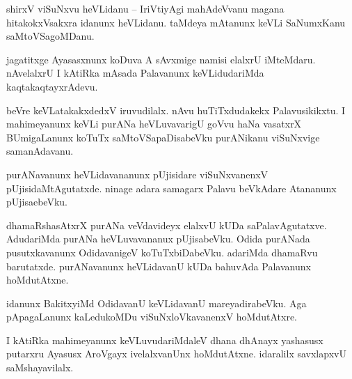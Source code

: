 \documentclass{article}
\begin{document}
\begin{mn}%
shirxV viSuNxvu heVLidanu -- IriVtiyAgi mahAdeVvanu magana hitakokxVsakxra idanunx heVLidanu. 
taMdeya mAtanunx keVLi SaNumxKanu saMtoVSagoMDanu.
\end{mn}

\begin{mn}%
jagatitxge Ayasasxnunx koDuva A sAvxmige namisi elalxrU iMteMdaru. nAvelalxrU I kAtiRka mAsada 
Palavanunx keVLidudariMda kaqtakaqtayxrAdevu.
\end{mn}

\begin{mn}%
beVre keVLatakakxdedxV iruvudilalx. nAvu huTiTxdudakekx Palavusikikxtu. I mahimeyanunx keVLi 
purANa heVLuvavarigU goVvu haNa vasatxrX BUmigaLanunx koTuTx saMtoVSapaDisabeVku purANikanu 
viSuNxvige samanAdavanu.
\end{mn}

\begin{mn}%
purANavanunx heVLidavananunx pUjisidare viSuNxvanenxV pUjisidaMtAgutatxde. ninage adara samagarx 
Palavu beVkAdare Atananunx pUjisaebeVku.
\end{mn}

\begin{mn}%
dhamaRshasAtxrX purANa veVdavideyx elalxvU kUDa saPalavAgutatxve. AdudariMda purANa heVLuvavananux 
pUjisabeVku. Odida purANada pusutxkavanunx OdidavanigeV koTuTxbiDabeVku. adariMda dhamaRvu 
barutatxde. purANavanunx heVLidavanU kUDa bahuvAda Palavanunx hoMdutAtxne.
\end{mn}

\begin{mn}%
idanunx BakitxyiMd OdidavanU keVLidavanU mareyadirabeVku. Aga pApagaLanunx kaLedukoMDu 
viSuNxloVkavanenxV hoMdutAtxre. 
\end{mn}

\begin{mn}%
I kAtiRka mahimeyanunx keVLuvudariMdaleV dhana dhAnayx yashasusx putarxru Ayasusx AroVgayx 
ivelalxvanUnx hoMdutAtxne. idaralilx savxlapxvU saMshayavilalx.
\end{mn}

\end{document}
